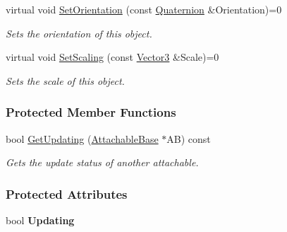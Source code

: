 \begin{DoxyCompactItemize}
virtual void \hyperlink{classMezzanine_1_1AttachableBase_a8c459c324efb01dc56cead8e7650f22e}{SetOrientation} (const \hyperlink{classMezzanine_1_1Quaternion}{Quaternion} \&Orientation)=0
\begin{DoxyCompactList}\small\item\em Sets the orientation of this object. \item\end{DoxyCompactList}\item 
virtual void \hyperlink{classMezzanine_1_1AttachableBase_a5201923c0685e592dee8cecabc72b508}{SetScaling} (const \hyperlink{classMezzanine_1_1Vector3}{Vector3} \&Scale)=0
\begin{DoxyCompactList}\small\item\em Sets the scale of this object. \item\end{DoxyCompactList}\end{DoxyCompactItemize}
\subsubsection*{Protected Member Functions}
\begin{DoxyCompactItemize}
\item 
\hypertarget{classMezzanine_1_1AttachableBase_a0d62e3708056e62911d6ec7c6beb3a97}{
bool \hyperlink{classMezzanine_1_1AttachableBase_a0d62e3708056e62911d6ec7c6beb3a97}{GetUpdating} (\hyperlink{classMezzanine_1_1AttachableBase}{AttachableBase} $\ast$AB) const }
\label{classMezzanine_1_1AttachableBase_a0d62e3708056e62911d6ec7c6beb3a97}

\begin{DoxyCompactList}\small\item\em Gets the update status of another attachable. \item\end{DoxyCompactList}\end{DoxyCompactItemize}
\subsubsection*{Protected Attributes}
\begin{DoxyCompactItemize}
\item 
\hypertarget{classMezzanine_1_1AttachableBase_ab1042d571c1a40f0ab79e33206ab9761}{
bool {\bfseries Updating}}
\label{classMezzanine_1_1AttachableBase_ab1042d571c1a40f0ab79e33206ab9761}

\end{DoxyCompactItemize}


